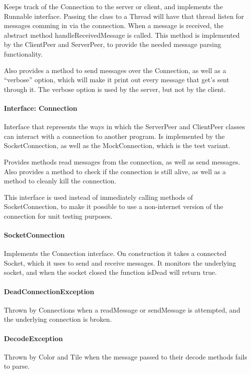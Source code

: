 \documentclass[12pt, letterpaper]{article}
\begin{document}
    Keeps track of the Connection to the server or client, and implements the Runnable interface.
    Passing the class to a Thread will have that thread listen for messages comming in via the connection.
    When a message is received, the abstract method handleReceivedMessage is called.
    This method is implemented by the ClientPeer and ServerPeer, to provide the needed message parsing functionality.

    Also provides a method to send messages over the Connection, as well as a ``verbose'' option, which will make it
    print out every message that get's sent through it.
    The verbose option is used by the server, but not by the client.

    \paragraph{Interface: Connection}
    Interface that represents the ways in which the ServerPeer and ClientPeer classes can interact with a connection to
    another program.
    Is implemented by the SocketConnection, as well as the MockConnection, which is the test variant.

    Provides methods read messages from the connection, as well as send messages.
    Also provides a method to check if the connection is still alive, as well as a method to
    cleanly kill the connection.

    This interface is used instead of immediately calling methods of SocketConnection, to make it possible to use
    a non-internet version of the connection for unit testing purposes.

    \paragraph{SocketConnection}
    Implements the Connection interface.
    On construction it takes a connected Socket, which it uses to send and receive messages.
    It monitors the underlying socket, and when the socket closed the function isDead will return true.


    \paragraph{DeadConnectionException}
    Thrown by Connections when a readMessage or sendMessage is attempted, and the underlying connection is broken.

    \paragraph{DecodeException}
    Thrown by Color and Tile when the message passed to their decode methods fails to parse.
\end{document}
